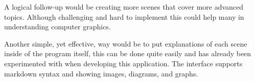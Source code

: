 \documentclass[cic,tc,english]{iiufrgs}
\begin{document}
A logical follow-up would be creating more scenes that cover more advanced topics. Although challenging and hard to implement this could help many in understanding computer graphics.

Another simple, yet effective, way would be to put explanations of each scene inside of the program itself, this can be done quite easily and has already been experimented with when developing this application. The interface supports markdown syntax and showing images, diagrams, and graphs.

%



\end{document}

